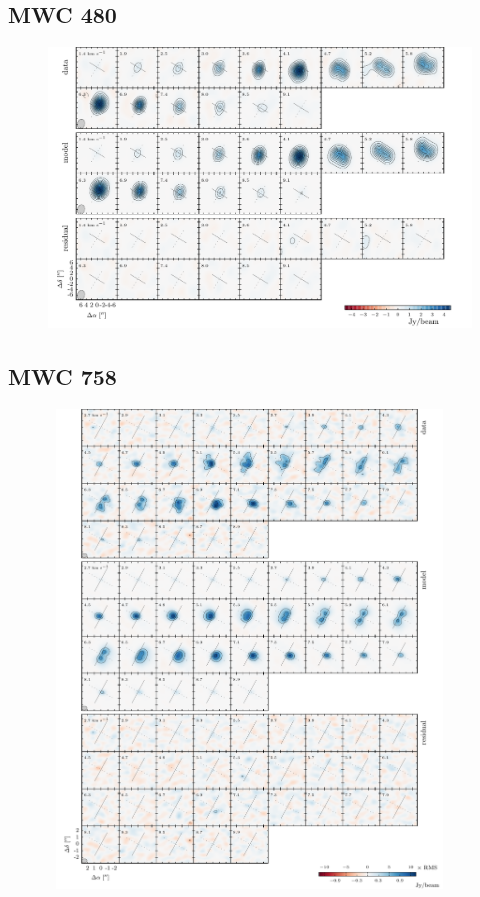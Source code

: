 \documentclass[twocolumn]{aastex6}
\begin{document}
\subsection{MWC 480}
\begin{figure}[htb]
\begin{center}
  \includegraphics{MWC480.pdf}
  \end{center}
\end{figure}

\subsection{MWC 758}

\begin{figure}[htb]
\begin{center}
  \includegraphics[draft, width=0.95\textwidth, height=5in]{MWC758.pdf}
  \end{center}
\end{figure}
\end{document}
